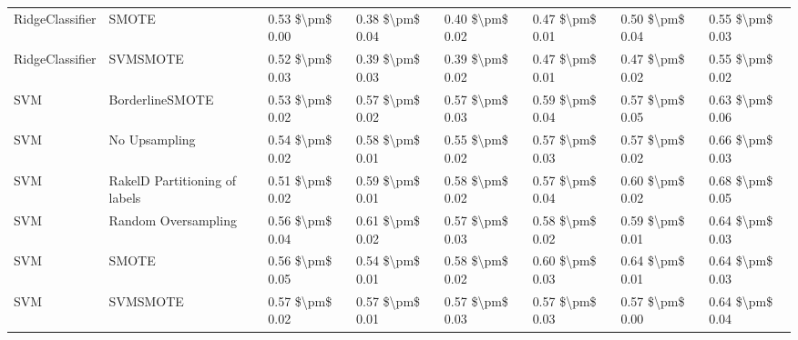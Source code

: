 \begin{tabular}{llllllll}
                RidgeClassifier &                         SMOTE &     0.53 \$\textbackslash pm\$ 0.00 &           0.38 \$\textbackslash pm\$ 0.04 &       0.40 \$\textbackslash pm\$ 0.02 &        0.47 \$\textbackslash pm\$ 0.01 &                         0.50 \$\textbackslash pm\$ 0.04 & 0.55 \$\textbackslash pm\$ 0.03 \\
                RidgeClassifier &                      SVMSMOTE &     0.52 \$\textbackslash pm\$ 0.03 &           0.39 \$\textbackslash pm\$ 0.03 &       0.39 \$\textbackslash pm\$ 0.02 &        0.47 \$\textbackslash pm\$ 0.01 &                         0.47 \$\textbackslash pm\$ 0.02 & 0.55 \$\textbackslash pm\$ 0.02 \\
                            SVM &               BorderlineSMOTE &     0.53 \$\textbackslash pm\$ 0.02 &           0.57 \$\textbackslash pm\$ 0.02 &       0.57 \$\textbackslash pm\$ 0.03 &        0.59 \$\textbackslash pm\$ 0.04 &                         0.57 \$\textbackslash pm\$ 0.05 & 0.63 \$\textbackslash pm\$ 0.06 \\
                            SVM &                 No Upsampling &     0.54 \$\textbackslash pm\$ 0.02 &           0.58 \$\textbackslash pm\$ 0.01 &       0.55 \$\textbackslash pm\$ 0.02 &        0.57 \$\textbackslash pm\$ 0.03 &                         0.57 \$\textbackslash pm\$ 0.02 & 0.66 \$\textbackslash pm\$ 0.03 \\
                            SVM & RakelD Partitioning of labels &     0.51 \$\textbackslash pm\$ 0.02 &           0.59 \$\textbackslash pm\$ 0.01 &       0.58 \$\textbackslash pm\$ 0.02 &        0.57 \$\textbackslash pm\$ 0.04 &                         0.60 \$\textbackslash pm\$ 0.02 & 0.68 \$\textbackslash pm\$ 0.05 \\
                            SVM &           Random Oversampling &     0.56 \$\textbackslash pm\$ 0.04 &           0.61 \$\textbackslash pm\$ 0.02 &       0.57 \$\textbackslash pm\$ 0.03 &        0.58 \$\textbackslash pm\$ 0.02 &                         0.59 \$\textbackslash pm\$ 0.01 & 0.64 \$\textbackslash pm\$ 0.03 \\
                            SVM &                         SMOTE &     0.56 \$\textbackslash pm\$ 0.05 &           0.54 \$\textbackslash pm\$ 0.01 &       0.58 \$\textbackslash pm\$ 0.02 &        0.60 \$\textbackslash pm\$ 0.03 &                         0.64 \$\textbackslash pm\$ 0.01 & 0.64 \$\textbackslash pm\$ 0.03 \\
                            SVM &                      SVMSMOTE &     0.57 \$\textbackslash pm\$ 0.02 &           0.57 \$\textbackslash pm\$ 0.01 &       0.57 \$\textbackslash pm\$ 0.03 &        0.57 \$\textbackslash pm\$ 0.03 &                         0.57 \$\textbackslash pm\$ 0.00 & 0.64 \$\textbackslash pm\$ 0.04 \\

\end{tabular}
